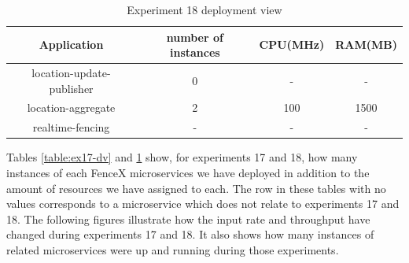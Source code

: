 \documentclass[a4]{report}
\begin{document}
    \begin{table}[h!]
        \centering
        \begin{tabular}{|c|c|c|c|}
            \hline
            Application               & number of instances & CPU(MHz) & RAM(MB) \\
            \hline
            location-update-publisher & 0                   & -        & -       \\
            location-aggregate        & 2                   & 100      & 1500    \\
            realtime-fencing          & -                   & -        & -       \\
            \hline
        \end{tabular}
        \caption{Experiment 18 deployment view}
        \label{table:ex18-dv}
    \end{table}

    Tables \ref{table:ex17-dv} and \ref{table:ex18-dv} show, for experiments 17 and 18, how many instances of each
    FenceX microservices we have deployed in addition to the amount of resources we have assigned to each.
    The row in these tables with no values corresponds to a microservice which does not relate to experiments 17 and 18.
    The following figures illustrate how the input rate and throughput have changed during experiments 17 and 18.
    It also shows how many instances of related microservices were up and running during those experiments.
\end{document}
